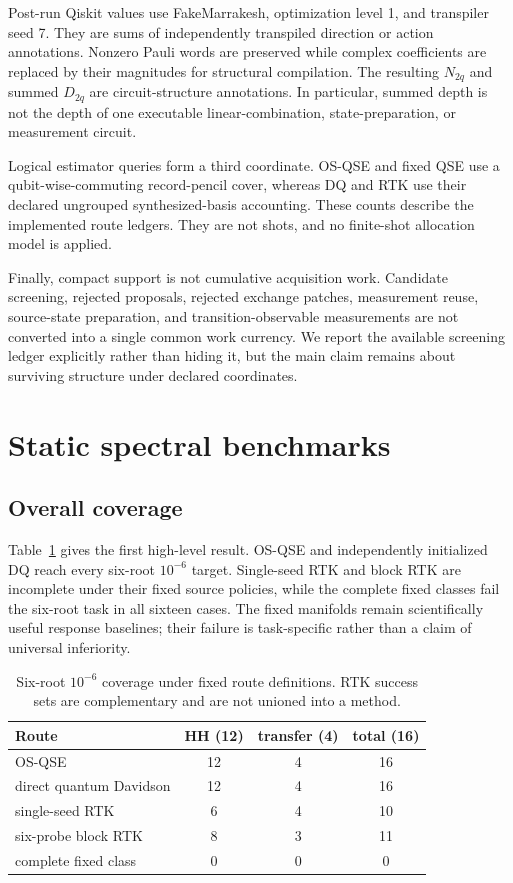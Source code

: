 \documentclass[
  reprint,
  amsmath,
  amssymb,
  aps,
  pra,
  nofootinbib,
  superscriptaddress,
  floatfix
]{revtex4-2}
\begin{document}
Post-run Qiskit values use FakeMarrakesh, optimization level 1, and transpiler
seed 7.  They are sums of independently transpiled direction or action
annotations.  Nonzero Pauli words are preserved while complex coefficients
are replaced by their magnitudes for structural compilation.  The resulting
$N_{2q}$ and summed $D_{2q}$ are circuit-structure annotations.  In
particular, summed depth is not the depth of one executable
linear-combination, state-preparation, or measurement circuit.

Logical estimator queries form a third coordinate.  OS-QSE and fixed QSE use
a qubit-wise-commuting record-pencil cover, whereas DQ and RTK use their
declared ungrouped synthesized-basis accounting.  These counts describe the
implemented route ledgers.  They are not shots, and no finite-shot allocation
model is applied.

Finally, compact support is not cumulative acquisition work.  Candidate
screening, rejected proposals, rejected exchange patches, measurement reuse,
source-state preparation, and transition-observable measurements are not
converted into a single common work currency.  We report the available
screening ledger explicitly rather than hiding it, but the main claim remains
about surviving structure under declared coordinates.

\section{Static spectral benchmarks}
\label{sec:static_results}

\subsection{Overall coverage}

Table~\ref{tab:coverage_summary} gives the first high-level result.  OS-QSE
and independently initialized DQ reach every six-root $10^{-6}$ target.
Single-seed RTK and block RTK are incomplete under their fixed source
policies, while the complete fixed classes fail the six-root task in all
sixteen cases.  The fixed manifolds remain scientifically useful response
baselines; their failure is task-specific rather than a claim of universal
inferiority.

\begin{table}[t]
\caption{Six-root $10^{-6}$ coverage under fixed route definitions.  RTK
success sets are complementary and are not unioned into a method.}
\label{tab:coverage_summary}
\centering
\small
\begin{tabular}{@{}lccc@{}}
\toprule
Route & HH (12) & transfer (4) & total (16) \\
\midrule
OS-QSE & 12 & 4 & 16 \\
direct quantum Davidson & 12 & 4 & 16 \\
single-seed RTK & 6 & 4 & 10 \\
six-probe block RTK & 8 & 3 & 11 \\
complete fixed class & 0 & 0 & 0 \\
\bottomrule
\end{tabular}
\end{table}
\end{document}
